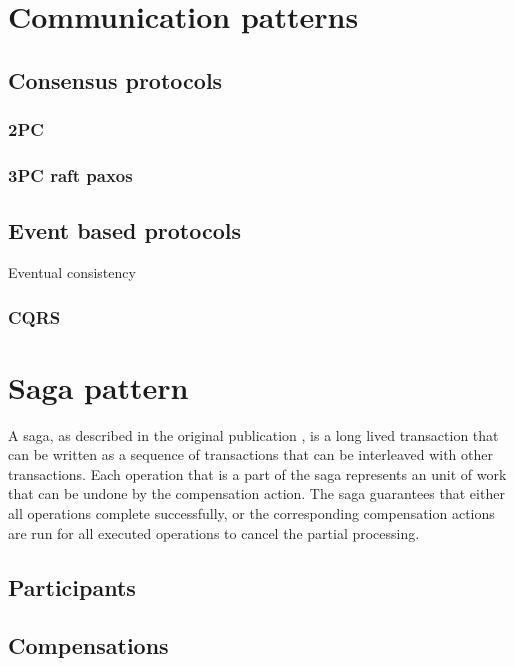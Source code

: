 \documentclass[oneside,
  digital, %
  table,   %
  nolof,     %
  nolot,     %
]{fithesis3}
\begin{document}
\chapter{Communication patterns}

\section{Consensus protocols}

\subsection{2PC}

\subsection{3PC raft paxos}

\section{Event based protocols}

Eventual consistency

\subsection{CQRS}


\chapter{Saga pattern}

A saga, as described in the original publication \cite{sagas_publ}, is a long lived transaction that can be written as a sequence of transactions that can be interleaved with other transactions. Each operation that is a part of the saga represents an unit of work that can be undone by the compensation action. The saga guarantees that either all operations complete successfully, or the corresponding compensation actions are run for all executed operations to cancel the partial processing.

\section{Participants}

\section{Compensations}
\end{document}
